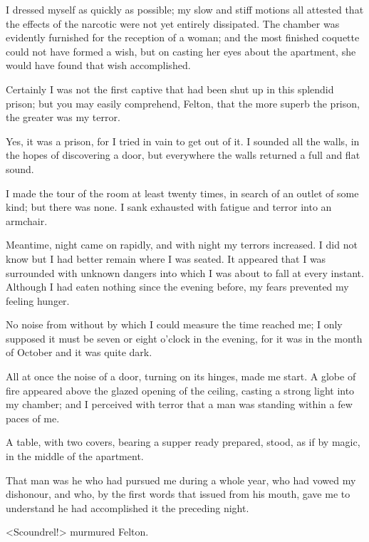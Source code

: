 {I dressed myself as quickly as possible; my slow and stiff motions all attested that the effects of the narcotic were not yet entirely dissipated. The chamber was evidently furnished for the reception of a woman; and the most finished coquette could not have formed a wish, but on casting her eyes about the apartment, she would have found that wish accomplished. 

Certainly I was not the first captive that had been shut up in this splendid prison; but you may easily comprehend, Felton, that the more superb the prison, the greater was my terror. 

Yes, it was a prison, for I tried in vain to get out of it. I sounded all the walls, in the hopes of discovering a door, but everywhere the walls returned a full and flat sound. 

I made the tour of the room at least twenty times, in search of an outlet of some kind; but there was none. I sank exhausted with fatigue and terror into an armchair. 

Meantime, night came on rapidly, and with night my terrors increased. I did not know but I had better remain where I was seated. It appeared that I was surrounded with unknown dangers into which I was about to fall at every instant. Although I had eaten nothing since the evening before, my fears prevented my feeling hunger. 

No noise from without by which I could measure the time reached me; I only supposed it must be seven or eight o'clock in the evening, for it was in the month of October and it was quite dark. 

All at once the noise of a door, turning on its hinges, made me start. A globe of fire appeared above the glazed opening of the ceiling, casting a strong light into my chamber; and I perceived with terror that a man was standing within a few paces of me. 

A table, with two covers, bearing a supper ready prepared, stood, as if by magic, in the middle of the apartment. 

That man was he who had pursued me during a whole year, who had vowed my dishonour, and who, by the first words that issued from his mouth, gave me to understand he had accomplished it the preceding night.} 

<Scoundrel!> murmured Felton. 

